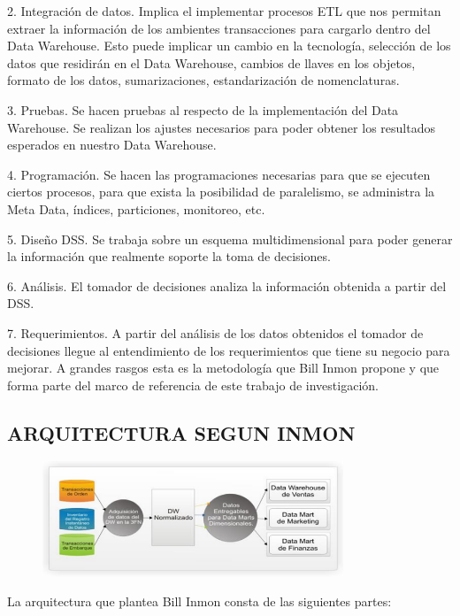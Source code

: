 \documentclass[%
 reprint,
 amsmath,amssymb,
 aps,
]{revtex4-1}
\begin{document}
2. Integración de datos. Implica el implementar procesos ETL que nos permitan extraer la información de los ambientes transacciones para cargarlo dentro del Data Warehouse. Esto puede implicar un cambio en la tecnología, selección de los datos que residirán en el Data Warehouse, cambios de llaves en los objetos, formato de los datos, sumarizaciones, estandarización de nomenclaturas.

3. Pruebas. Se hacen pruebas al respecto de la implementación del Data Warehouse. Se realizan los ajustes necesarios para poder obtener los resultados esperados en nuestro Data Warehouse.

4. Programación. Se hacen las programaciones necesarias para que se ejecuten ciertos procesos, para que exista la posibilidad de paralelismo, se administra la Meta Data, índices, particiones, monitoreo, etc.

5. Diseño DSS. Se trabaja sobre un esquema multidimensional para poder generar la información que realmente soporte la toma de decisiones.

6. Análisis. El tomador de decisiones analiza la información obtenida a partir del DSS.

7. Requerimientos. A partir del análisis de los datos obtenidos el tomador de decisiones llegue al entendimiento de los requerimientos que tiene su negocio para mejorar. A grandes rasgos esta es la metodología que Bill Inmon propone y que forma parte del marco de referencia de este trabajo de investigación.

\subsection{ARQUITECTURA SEGUN INMON}
\begin{figure}[htb]
				\begin{center}
					\includegraphics[width=9cm]{./IMAGENES/imgleydi2}
				\end{center}
			\end{figure}

La arquitectura que plantea Bill Inmon consta de las siguientes partes: \cite{robles1}
\end{document}
